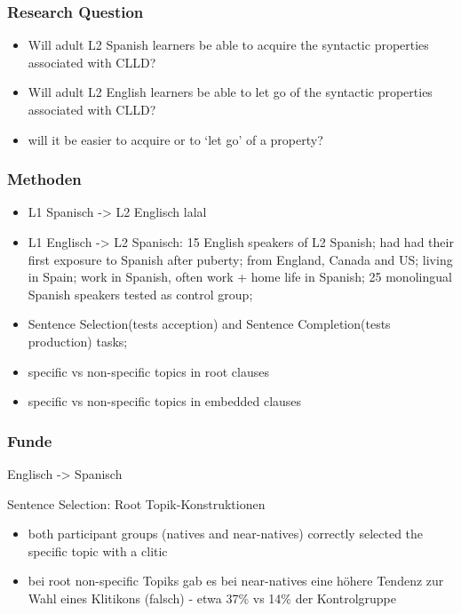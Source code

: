 \subsubsection{Research Question}
\begin{itemize}
    \item Will adult L2 Spanish learners be able to acquire the syntactic properties associated with CLLD?
    \item Will adult L2 English learners be able to let go of the syntactic properties associated with CLLD?
    \item will it be easier to acquire or to ‘let go’ of a property?
\end{itemize}

\subsubsection{Methoden}

\begin{itemize}
    \item L1 Spanisch -> L2 Englisch lalal
    \item L1 Englisch -> L2 Spanisch: 15 English speakers of L2 Spanish; had had their first exposure to Spanish after puberty;
        from England, Canada and US; living in Spain; work in Spanish, often work + home life in Spanish;
        25 monolingual Spanish speakers tested as control group;
    \item Sentence Selection(tests acception) and Sentence Completion(tests production) tasks;
    \item specific vs non-specific topics in root clauses
    \item specific vs non-specific topics in embedded clauses
\end{itemize}

\subsubsection{Funde}

Englisch -> Spanisch

Sentence Selection: Root Topik-Konstruktionen
\begin{itemize}
    \item both participant groups (natives and near-natives) correctly selected the specific topic with a clitic
    \item bei root non-specific Topiks gab es bei near-natives eine höhere Tendenz zur Wahl eines Klitikons (falsch) - etwa 37\% vs 14\% der Kontrolgruppe
\end{itemize}

